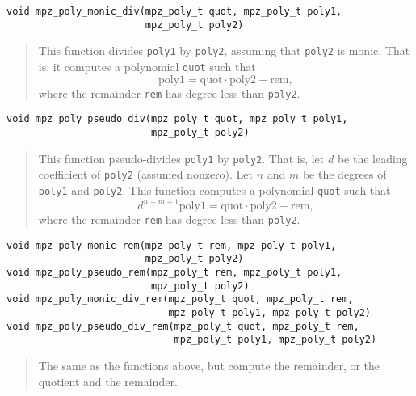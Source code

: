 \documentclass[a4paper,10pt]{article}
\newcommand{\code}{\lstinline}
\begin{document}
\begin{lstlisting}
void mpz_poly_monic_div(mpz_poly_t quot, mpz_poly_t poly1,
                        mpz_poly_t poly2)
\end{lstlisting}
\begin{quote}
This function divides \code{poly1} by \code{poly2}, assuming that \code{poly2} is monic. That is, it computes a polynomial \code{quot} such that
 \[ \text{poly1} = \text{quot} \cdot \text{poly2} + \text{rem}, \]
where the remainder \code{rem} has degree less than \code{poly2}.
\end{quote}

\begin{lstlisting}
void mpz_poly_pseudo_div(mpz_poly_t quot, mpz_poly_t poly1,
                         mpz_poly_t poly2)
\end{lstlisting}
\begin{quote}
This function pseudo-divides \code{poly1} by \code{poly2}. That is, let $d$ be the leading coefficient of \code{poly2} (assumed nonzero). Let $n$ and $m$ be the degrees of \code{poly1} and \code{poly2}. This function computes a polynomial \code{quot} such that
 \[ d^{n-m+1} \text{poly1} = \text{quot} \cdot \text{poly2} + \text{rem}, \]
where the remainder \code{rem} has degree less than \code{poly2}.
\end{quote}


\begin{lstlisting}
void mpz_poly_monic_rem(mpz_poly_t rem, mpz_poly_t poly1,
                        mpz_poly_t poly2)
void mpz_poly_pseudo_rem(mpz_poly_t rem, mpz_poly_t poly1,
                         mpz_poly_t poly2)
void mpz_poly_monic_div_rem(mpz_poly_t quot, mpz_poly_t rem,
                            mpz_poly_t poly1, mpz_poly_t poly2)
void mpz_poly_pseudo_div_rem(mpz_poly_t quot, mpz_poly_t rem, 
                             mpz_poly_t poly1, mpz_poly_t poly2)
\end{lstlisting}
\begin{quote}
The same as the functions above, but compute the remainder, or the quotient and the remainder.
\end{quote}
\end{document}

